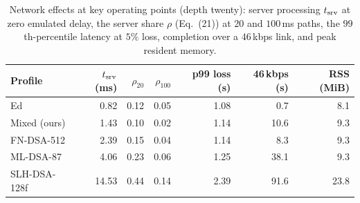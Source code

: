 \begin{table}[t]
\centering\small
\caption{Network effects at key operating points (depth twenty): server processing $t_{\rm srv}$ at zero emulated delay, the server share $\rho$ (Eq.~(21)) at $20$ and $100$\,ms paths, the $99$th-percentile latency at $5\%$ loss, completion over a $46$\,kbps link, and peak resident memory.}
\label{tab:neteffects}
\begin{tabular}{lrrrrrr}
\hline
Profile & $t_{\rm srv}$ (ms) & $\rho_{20}$ & $\rho_{100}$ & p99 loss (s) & 46\,kbps (s) & RSS (MiB)\\
\hline
Ed & 0.82 & 0.12 & 0.05 & 1.08 & 0.7 & 8.1 \\
Mixed (ours) & 1.43 & 0.10 & 0.02 & 1.14 & 10.6 & 9.3 \\
FN-DSA-512 & 2.39 & 0.15 & 0.04 & 1.14 & 8.3 & 9.3 \\
ML-DSA-87 & 4.06 & 0.23 & 0.06 & 1.25 & 38.1 & 9.3 \\
SLH-DSA-128f & 14.53 & 0.44 & 0.14 & 2.39 & 91.6 & 23.8 \\
\hline
\end{tabular}
\end{table}